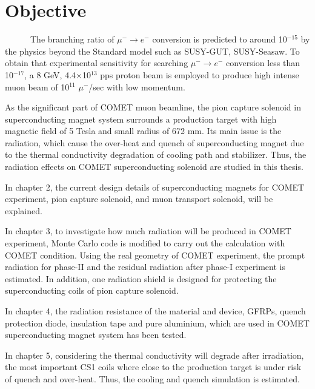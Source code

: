 \section{Objective}
~~~~~~The branching ratio of $\mu^- \rightarrow e^-$ conversion is predicted to around 10$^{-15}$ by the physics beyond the Standard model such as SUSY-GUT, SUSY-Seasaw.
To obtain that experimental sensitivity for searching $\mu^- \rightarrow e^-$ conversion less than 10$^{-17}$, a 8 GeV, 4.4$\times$10$^{13}$ pps proton beam is employed to produce high intense muon beam of 10$^{11}$ $\mu^-$/sec with low momentum.

As the significant part of COMET muon beamline, the pion capture solenoid in superconducting magnet system surrounds a production target with high magnetic field of 5 Tesla and small radius of 672 mm.
Its main issue is the radiation, which cause the over-heat and quench of superconducting magnet due to the thermal conductivity degradation of cooling path and stabilizer.
Thus, the radiation effects on COMET superconducting solenoid are studied in this thesis.

In chapter 2, the current design details of superconducting magnets for COMET experiment, pion capture solenoid, and muon transport solenoid, will be explained.

In chapter 3, to investigate how much radiation will be produced in COMET experiment, Monte Carlo code is modified to carry out the calculation with COMET condition.
Using the real geometry of COMET experiment, the prompt radiation for phase-II and the residual radiation after phase-I experiment is estimated.
In addition, one radiation shield is designed for protecting the superconducting coils of pion capture solenoid.

In chapter 4, the radiation resistance of the material and device, GFRPs, quench protection diode, insulation tape and pure aluminium, which are used in COMET superconducting magnet system has been tested.

In chapter 5, considering the thermal conductivity will degrade after irradiation, the most important CS1 coils where close to the production target is under risk of quench and over-heat.
Thus, the cooling and quench simulation is estimated.


